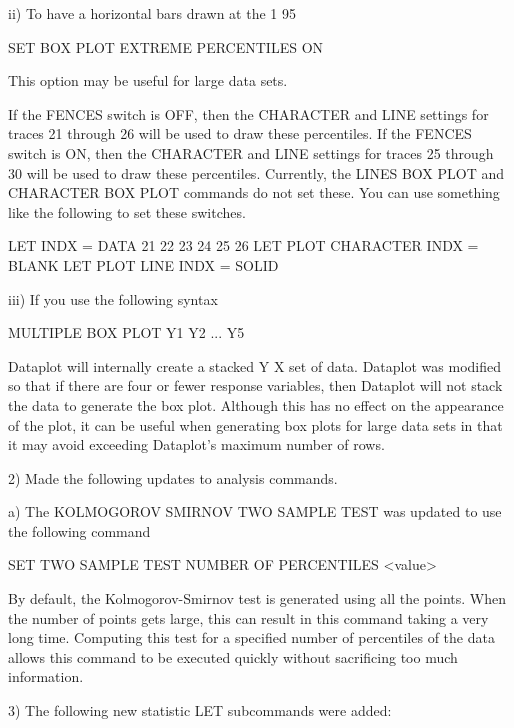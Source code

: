          ii) To have a horizontal bars drawn at the 1%
             95%

                SET BOX PLOT EXTREME PERCENTILES ON

             This option may be useful for large data sets.

             If the FENCES switch is OFF, then the CHARACTER and LINE
             settings for traces 21 through 26 will be used to draw these
             percentiles.  If the FENCES switch is ON, then the CHARACTER
             and LINE settings for traces 25 through 30 will be used to
             draw these percentiles.  Currently, the LINES BOX PLOT and
             CHARACTER BOX PLOT commands do not set these.  You can use
             something like the following to set these switches.

                LET INDX = DATA 21 22 23 24 25 26
                LET PLOT CHARACTER INDX = BLANK
                LET PLOT LINE      INDX = SOLID

        iii) If you use the following syntax

                MULTIPLE BOX PLOT Y1 Y2 ... Y5

             Dataplot will internally create a stacked Y X set of data.
             Dataplot was modified so that if there are four or fewer
             response variables, then Dataplot will not stack the data
             to generate the box plot.  Although this has no effect on
             the appearance of the plot, it can be useful when generating
             box plots for large data sets in that it may avoid exceeding
             Dataplot's maximum number of rows.

 2) Made the following updates to analysis commands.

    a) The KOLMOGOROV SMIRNOV TWO SAMPLE TEST was updated to use the
       following command

           SET TWO SAMPLE TEST NUMBER OF PERCENTILES <value>

       By default, the Kolmogorov-Smirnov test is generated using all
       the points.  When the number of points gets large, this can result
       in this command taking a very long time.  Computing this test for
       a specified number of percentiles of the data allows this command
       to be executed quickly without sacrificing too much information.

 3) The following new statistic LET subcommands were added:

